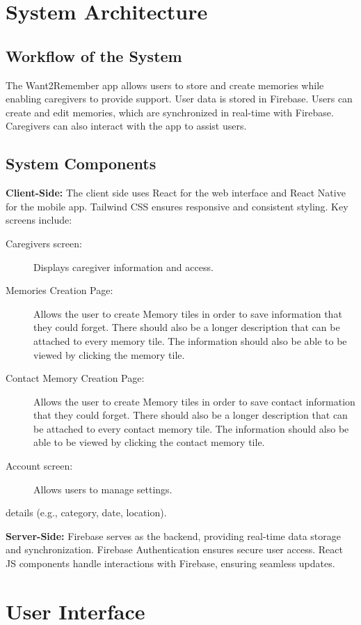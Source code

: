 \documentclass{article}
\begin{document}
\section{System Architecture}
\subsection{Workflow of the System}
The Want2Remember app allows users to store and create memories while enabling caregivers to provide support. User data is stored in Firebase. Users can create and edit memories, which are synchronized in real-time with Firebase. Caregivers can also interact with the app to assist users.

\subsection{System Components}
\textbf{Client-Side:} 
The client side uses React for the web interface and React Native for the mobile app. Tailwind CSS ensures responsive and consistent styling. Key screens include:
\begin{description}
\item[Caregivers screen:] Displays caregiver information and access.
\item[Memories Creation Page:] Allows the user to create Memory tiles in order to save information that they could forget. There should also be a longer description that can be attached to every memory tile. The information should also be able to be viewed by clicking the memory tile.
\item[Contact Memory Creation Page:] Allows the user to create Memory tiles in order to save contact information that they could forget. There should also be a longer description that can be attached to every contact memory tile. The information should also be able to be viewed by clicking the contact memory tile.
\item[Account screen:] Allows users to manage settings.
\end{description} details (e.g., category, date, location).

\textbf{Server-Side:} 
Firebase serves as the backend, providing real-time data storage and synchronization. Firebase Authentication ensures secure user access. React JS components handle interactions with Firebase, ensuring seamless updates.

\section{User Interface}
\end{document}
